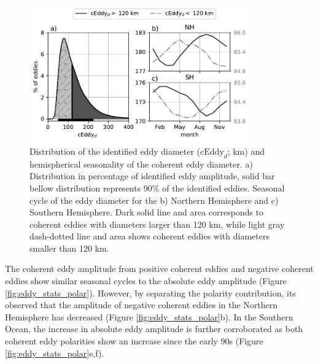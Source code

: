 \documentclass[draft,linenumbers]{agujournal2019}
\newcommand{\cEddy}{\textrm{cEddy}}
\begin{document}
	\begin{figure}
	    \centering
	    \includegraphics[width=95mm]{figures/eddy_diameter_seasonal.pdf}
	    \caption{Distribution of the identified eddy diameter ($\cEddy_d$; km) and hemispherical seasonality of the coherent eddy diameter. a) Distribution in percentage of identified eddy amplitude, solid bar bellow distribution represents 90\% of the identified eddies. Seasonal cycle of the eddy diameter for the b) Northern Hemisphere and c) Southern Hemisphere. Dark solid line and area corresponds to coherent eddies with diameters larger than 120 km, while light gray dash-dotted line and area shows coherent eddies with diameters smaller than 120 km.}
	    \label{fig:eddy_diameter}
	\end{figure}

	The coherent eddy amplitude from positive coherent eddies and negative coherent eddies show similar seasonal cycles to the absolute eddy amplitude (Figure \ref{fig:eddy_stats_polar}).
	However, by separating the polarity contribution, its observed that the amplitude of negative coherent eddies in the Northern Hemisphere has decreased (Figure \ref{fig:eddy_stats_polar}b). 
	In the Southern Ocean, the increase in absolute eddy amplitude is further corroborated as both coherent eddy polarities show an increase since the early 90s (Figure \ref{fig:eddy_stats_polar}e,f).


\end{document}
